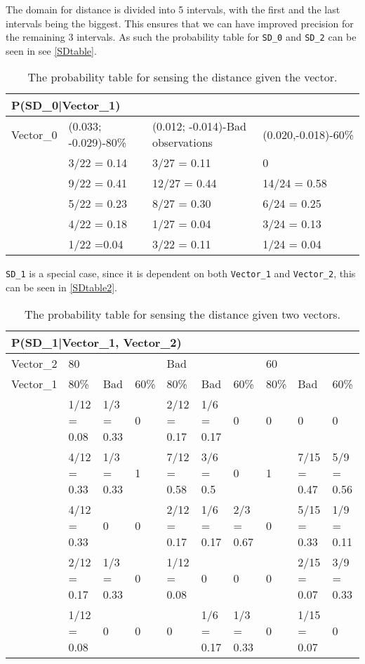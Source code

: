 The domain for distance is divided into 5 intervals, with the first and the last
intervals being the biggest. This ensures that we can have improved precision
for the remaining 3 intervals. As such the probability table for \texttt{SD\_0}
and \texttt{SD\_2} can be seen in see \autoref{SDtable}.

\begin{center}
\begin{table}[H]
\begin{tabular}{|l|l|l|l|}
\hline
\multicolumn{4}{|l|}{P(SD\_0|Vector\_1)} \\ \hline
Vector\_0     & (0.033; -0.029)-80\% & (0.012; -0.014)-Bad observations &
(0.020,-0.018)-60\% \\\hline 
[0 - 60]      & 3/22 = 0.14 & 3/27 = 0.11 & 0 \\ \hline 
[60 - 75]    & 9/22 = 0.41 & 12/27 = 0.44 & 14/24 = 0.58 \\ \hline
[75 - 90]   & 5/22 = 0.23 & 8/27 = 0.30 & 6/24 = 0.25 \\ \hline
[90 - 105]   & 4/22 = 0.18 & 1/27 = 0.04 & 3/24 = 0.13 \\ \hline
[105 - 255]   & 1/22 =0.04 & 3/22 = 0.11 & 1/24 = 0.04   \\ \hline
\end{tabular}
\caption{The probability table for sensing the distance given the vector.}
\label{SDtable}
\end{table}
\end{center}

\texttt{SD\_1} is a special case, since it is dependent on
both \texttt{Vector\_1} and \texttt{Vector\_2}, this can be seen in
\autoref{SDtable2}.

\begin{table}[H]
\centering
\begin{tabular}{|l|l|l|l|l|l|l|l|l|l|}
\hline
\multicolumn{10}{|l|}{P(SD\_1|Vector\_1, Vector\_2)} \\\hline 
Vector\_2 & \multicolumn{3}{l|}{80} & \multicolumn{3}{l|}{Bad} &
\multicolumn{3}{l|}{60}\\\hline 
Vector\_1 & 80\%      &  Bad     & 60\%      & 80\%      & Bad      & 60\%     
& 80\% & Bad & 60\% \\\hline
[0-60]&1/12 = 0.08 & 1/3 = 0.33 & 0      & 2/12 = 0.17 & 1/6 = 0.17 & 0 & 0  
& 0 & 0 \\ \hline
[60-75]&4/12 = 0.33 & 1/3 = 0.33 & 1      & 7/12 = 0.58 & 3/6 = 0.5 & 0      & 1     
& 7/15 = 0.47 & 5/9 = 0.56\\ \hline
[75-90] & 4/12 = 0.33 & 0 & 0 & 2/12 = 0.17 & 1/6 = 0.17 & 2/3 = 0.67 & 0 
& 5/15 = 0.33 &1/9 = 0.11\\\hline
[90-105] & 2/12 = 0.17 & 1/3 = 0.33 & 0 & 1/12 = 0.08 & 0 & 0 & 0 
& 2/15 = 0.07  & 3/9 = 0.33\\\hline
[105-255] & 1/12 = 0.08 & 0 & 0 & 0 & 1/6 = 0.17 & 1/3 = 0.33 & 0 & 1/15 = 0.07     
&0\\\hline
\end{tabular}
\caption{The probability table for sensing the distance given two vectors.}
\label{SDtable2}
\end{table}

